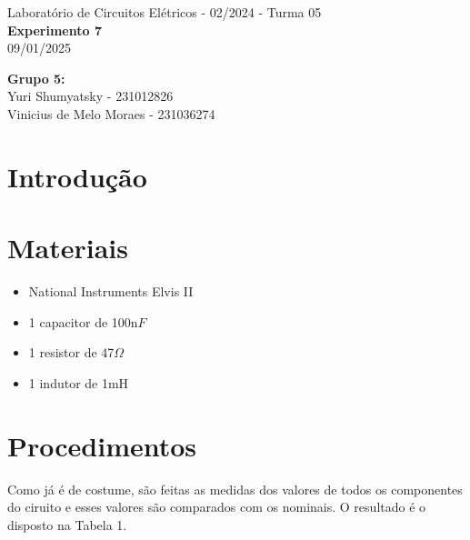 \documentclass[a4 paper]{article}
\newcommand{\parag}{\hspace{30pt}}
\begin{document}
\justifying
\begin{center}{\large Laboratório de Circuitos Elétricos - 02/2024 - Turma 05}\\
{\large \textbf{Experimento 7}}\\ 
09/01/2025
\end{center}

\vspace{500pt}
 \noindent\textbf{Grupo 5:}\\
 Yuri Shumyatsky - 231012826\\
Vinicius de Melo Moraes - 231036274\\



\vspace{30pt}
\newpage

\section{Introdução}


\section{Materiais}
	\begin{itemize}
	\item National Instruments Elvis II
	\item 1 capacitor de 100n$F$
	\item 1 resistor de 47$\Omega$
	\item 1 indutor de 1mH
	\end{itemize}

\newpage
\section{Procedimentos}
\parag Como já é de costume, são feitas as medidas dos valores de todos os componentes do ciruito e esses valores são comparados com os nominais. O resultado é o disposto na Tabela 1.








\end{document}
